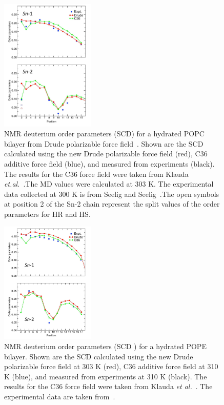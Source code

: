 \documentclass[12pt]{article}
\begin{document}
\begin{figure}[!htb]
	\centering
	\includegraphics[width=0.4\textwidth]{../Figures/popc_order_parameters_drude.png}
	\caption{NMR deuterium order parameters (SCD) for a hydrated
		POPC bilayer from Drude polarizable force field~\cite{li2017drude}. Shown are the SCD calculated using the new Drude
		polarizable force field (red), C36 additive force field (blue), and
		measured from experiments (black). The results for the C36 force field were taken from Klauda \textit{et.al.}~\cite{klauda2010update}.The MD values were calculated at 303 K. The experimental data collected at 300 K is from Seelig and Seelig~\cite{seelig1975bilayers}.The open symbols at position 2 of the Sn-2 chain represent the split values of the order parameters for HR and HS.}
	\label{fig:drudepopc}
	\end{figure}
		
\begin{figure}[!hbt]
	\centering
	\includegraphics[width=0.4\textwidth]{../Figures/pope_order_parameters_drude.png}
	\caption{NMR deuterium order parameters (SCD ) for a hydrated POPE bilayer. Shown are the SCD calculated using the new Drude
		polarizable force field at 303 K (red), C36 additive force field at 310 K
		(blue), and measured from experiments at 310 K (black). The results for the C36 force field were taken from Klauda \textit{et al.}~\cite{klauda2010update}. The experimental data are taken from~\cite{shaikh2002monounsaturated,perly1985acyl}.}
	\label{fig:drudepope}
	\end{figure}
			
\end{document}

